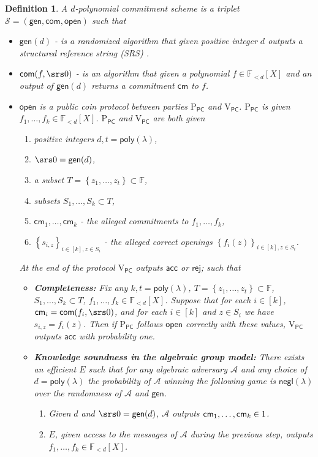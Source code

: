 \documentclass[11pt]{article} %
\newcommand{\F}{\ensuremath{\mathbb F}\xspace}
\newcommand{\adv}{\ensuremath{\mathcal A}\xspace}
\newcommand{\com}{\ensuremath{\mathsf{com}}\xspace}
\newcommand{\cm}{\ensuremath{\mathsf{cm}}\xspace}
\newcommand{\open}{\ensuremath{\mathsf{open}}\xspace}
\newcommand{\negl}{\ensuremath{\mathsf{negl}(\lambda)}\xspace}
\newcommand{\rej}{\ensuremath{\mathsf{rej}}\xspace}
\newcommand{\acc}{\ensuremath{\mathsf{acc}}\xspace}
\newcommand{\sett}[2]{\ensuremath{\set{#1}_{#2}}\xspace}
\newcommand{\gen}{\ensuremath{\mathsf{gen}}\xspace}
\newcommand{\prvpc}{\ensuremath{\mathrm{P_{\mathsf{PC}}}}\xspace}
\newcommand{\verpc}{\ensuremath{\mathrm{V_{\mathsf{PC}}}}\xspace}
\newcommand{\ext}{\ensuremath{E}\xspace}
\newcommand{\set}[1]{\ensuremath{\left\{#1\right\}}\xspace}
\newcommand{\polysofdeg}[1]{\ensuremath{\F_{< #1}[X]}\xspace}
\newcommand{\PCscheme}{\ensuremath{\mathscr{S}}\xspace}
\newtheorem{dfn}[lemma]{Definition}
\newcommand{\poly}{\ensuremath{\mathsf{poly(\lambda)}}\xspace}
\begin{document}
\begin{dfn}\label{dfn:PCscheme}
A $d$-polynomial commitment scheme is a triplet $\PCscheme = (\gen,\com,\open)$ such that 
\begin{itemize}
 \item $\gen(d)$ -  is a randomized algorithm that given positive integer $d$ outputs a structured reference string (SRS) .
 \item $\com(f,\srs0)$ - is an algorithm that given a polynomial $f\in \polysofdeg{d}$ and an output  of $\gen(d)$  returns a commitment \cm to $f$.
 \item \open is a public coin protocol between parties \prvpc and \verpc. \prvpc is given $ f_1,\ldots,f_k \in \polysofdeg{d}$. \prvpc and \verpc are both given
 
 \begin{enumerate}
  \item  positive integers $d,t=\poly$,
  \item  $\srs0=\gen(d)$,
  \item a subset $T=\set{z_1,\ldots,z_t}\subset \F$,
  \item subsets $S_1,\ldots,S_k \subset T$,
  \item $\cm_1,\ldots,\cm_k$ - the alleged commitments to $f_1,\ldots,f_k$,
  \item \sett{s_{i,z}}{i\in [k],z\in S_i} - the alleged correct openings \sett{f_i(z)}{i\in [k], z\in S_i}.  
 \end{enumerate}
 At the end of the protocol \verpc outputs \acc or \rej;
such that
\begin{itemize}
 \item \textbf{Completeness:} Fix any $k,t=\poly$, $T=\set{z_1,\ldots,z_t}\subset \F$, $S_1,\ldots,S_k \subset T$, $f_1,\ldots,f_k\in \polysofdeg{d}$. Suppose that for each $i\in [k]$, $\cm_i = \com(f_i,\srs0)$, and for each $i\in [k]$ and $z \in S_i$ we have  $s_{i,z} = f_i(z)$.  Then if \prvpc follows \open correctly with these values, \verpc outputs \acc with probability one.
 \item \textbf{Knowledge soundness in the algebraic group model:} There exists an efficient \ext such that for any algebraic adversary \adv and any choice of $d=\poly$ the probability of \adv winning the following game is \negl over the randomness of \adv and \gen.
 \begin{enumerate}
  \item Given $d$ and $\srs0=\gen(d)$, \adv outputs $\cm_1,\ldots,\cm_k\in \G1$.
  \item \ext, given access to the messages of \adv during the previous step, outputs $f_1,\ldots,f_k \in \polysofdeg{d}$.

\end{enumerate}
\end{itemize}
\end{itemize}
\end{dfn}
\end{document}
